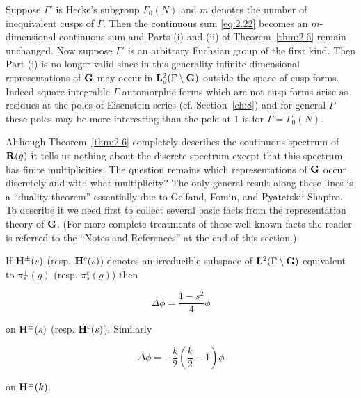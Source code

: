 \begin{remark}\label{rem:2.7}

Suppose $\Gamma'$ is Hecke's subgroup $\Gamma_0(N)$ and $m$ denotes the number of inequivalent cusps of $\Gamma$. Then the continuous sum \eqref{eq:2.22} becomes an $m$-dimensional continuous sum and Parts (i) and (ii) of Theorem~\ref{thm:2.6} remain unchanged. Now suppose $\Gamma'$ is an arbitrary Fuchsian group of the first kind. Then Part (i) is no longer valid since in this generality infinite dimensional representations of $\mathbf{G}$ may occur in $\mathbf{L}_d^2(\Gamma \setminus \mathbf{G})$ outside the space of cusp forms. Indeed square-integrable $\Gamma$-automorphic forms which are not cusp forms arise as residues at the poles of Eisenstein series (cf. Section~\ref{ch:8}) and for general $\Gamma$ these poles may be more interesting than the pole at 1 is for $\Gamma = \Gamma_0(N)$.

\end{remark}

\begin{remark}\label{rem:2.8}

Although Theorem~\ref{thm:2.6} completely describes the continuous spectrum of $\mathbf{R}(g)$ it tells us nothing about the discrete spectrum except that this spectrum has finite multiplicities. The question remains which representations of $\mathbf{G}$ occur discretely and with what multiplicity? The only general result along these lines is a ``duality theorem'' essentially due to Gelfand, Fomin, and Pyatetskii-Shapiro. To describe it we need first to collect several basic facts from the representation theory of $\mathbf{G}$. (For more complete treatments of these well-known facts the reader is referred to the ``Notes and References'' at the end of this section.)

\end{remark}

\begin{lemma}\label{lem:2.9}

If $\mathbf{H}^{\pm}(s)$ (resp. $\mathbf{H}^{c}(s)$) denotes an irreducible subspace of $\mathbf{L}^2(\Gamma \setminus \mathbf{G})$ equivalent to $\pi_s^{\pm}(g)$ (resp. $\pi_s^{c}(g)$) then

\begin{equation}\label{eq:2.23}
\Delta\phi = \frac{1 - s^2}{4}\phi\tag{2.23}
\end{equation}

on $\mathbf{H}^{\pm}(s)$ (resp. $\mathbf{H}^{c}(s)$). Similarly

\begin{equation}\label{eq:2.24}
\Delta\phi = -\frac{k}{2}\left(\frac{k}{2} - 1\right)\phi\tag{2.24}
\end{equation}

on $\mathbf{H}^{\pm}(k)$.

\end{lemma}

